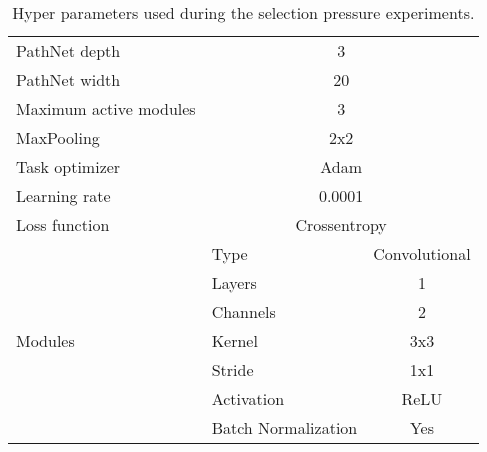 \begin{table}[ht]
\centering
\begin{tabular}{llc}
PathNet depth            & \multicolumn{2}{c}{3}               \\
PathNet width            & \multicolumn{2}{c}{20}              \\
Maximum active modules   & \multicolumn{2}{c}{3}               \\
MaxPooling               & \multicolumn{2}{c}{2x2}             \\
Task optimizer           & \multicolumn{2}{c}{Adam}            \\
Learning rate            & \multicolumn{2}{c}{0.0001}          \\
Loss function            & \multicolumn{2}{c}{Crossentropy}    \\
\multirow{7}{*}{Modules} & Type                & Convolutional \\
                         & Layers              & 1             \\
                         & Channels            & 2             \\
                         & Kernel              & 3x3           \\
                         & Stride              & 1x1           \\
                         & Activation          & ReLU          \\
                         & Batch Normalization & Yes           \\
\end{tabular}
\caption[Selection pressure experiment hyper-parameters]{Hyper parameters used during the selection pressure experiments.}
\label{tab:exp2.hyperparams}
\end{table}